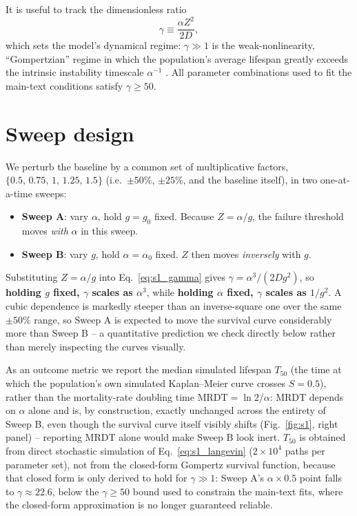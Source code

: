 It is useful to track the dimensionless ratio
\begin{equation}
\gamma \equiv \frac{\alpha Z^2}{2D},
\label{eq:s1_gamma}
\end{equation}
which sets the model's dynamical regime: $\gamma \gg 1$ is the
weak-nonlinearity, ``Gompertzian'' regime in which the population's
average lifespan greatly exceeds the intrinsic instability timescale
$\alpha^{-1}$ \cite{podolskiy2016}. All parameter combinations used to fit
the main-text conditions satisfy $\gamma \geq 50$.

\section*{Sweep design}

We perturb the baseline by a common set of multiplicative factors,
$\{0.5,\,0.75,\,1,\,1.25,\,1.5\}$ (i.e.\ $\pm 50\%$, $\pm 25\%$, and the
baseline itself), in two one-at-a-time sweeps:

\begin{itemize}
\item \textbf{Sweep A}: vary $\alpha$, hold $g=g_0$ fixed. Because
$Z = \alpha/g$, the failure threshold moves \emph{with} $\alpha$ in this
sweep.
\item \textbf{Sweep B}: vary $g$, hold $\alpha=\alpha_0$ fixed. $Z$ then
moves \emph{inversely} with $g$.
\end{itemize}

Substituting $Z=\alpha/g$ into Eq.~\eqref{eq:s1_gamma} gives
$\gamma = \alpha^3/(2Dg^2)$, so \textbf{holding $g$ fixed, $\gamma$ scales
as $\alpha^3$}, while \textbf{holding $\alpha$ fixed, $\gamma$ scales as
$1/g^2$}. A cubic dependence is markedly steeper than an inverse-square
one over the same $\pm 50\%$ range, so Sweep A is expected to move the
survival curve considerably more than Sweep B -- a quantitative
prediction we check directly below rather than merely inspecting the
curves visually.

As an outcome metric we report the median simulated lifespan $T_{50}$
(the time at which the population's own simulated Kaplan--Meier curve
crosses $S=0.5$), rather than the mortality-rate doubling time
$\mathrm{MRDT}=\ln2/\alpha$: MRDT depends on $\alpha$ alone and is, by
construction, exactly unchanged across the entirety of Sweep B, even
though the survival curve itself visibly shifts (Fig.~\ref{fig:s1}, right
panel) -- reporting MRDT alone would make Sweep B look inert. $T_{50}$ is
obtained from direct stochastic simulation of
Eq.~\eqref{eq:s1_langevin} ($2\times10^4$ paths per parameter set), not
from the closed-form Gompertz survival function, because that closed form
is only derived to hold for $\gamma \gg 1$: Sweep A's $\alpha\times0.5$
point falls to $\gamma \approx 22.6$, below the $\gamma\geq50$ bound used
to constrain the main-text fits, where the closed-form approximation is
no longer guaranteed reliable.


